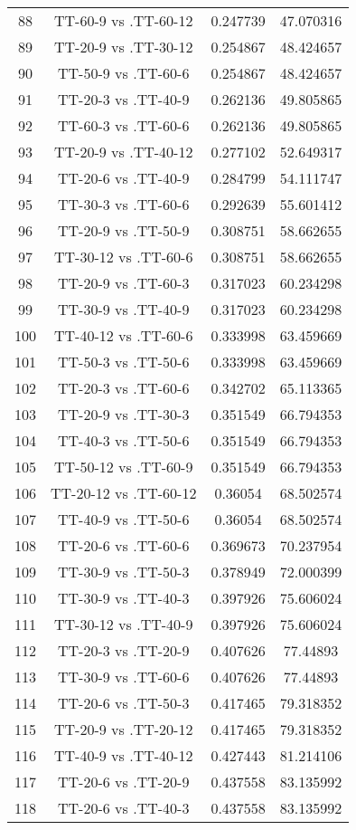 \documentclass[a4paper,10pt]{article}
\begin{document}
\begin{landscape}
\begin{table}[!htp]
\begin{tabular}{cccc}
88&TT-60-9 vs .TT-60-12&0.247739&47.070316\\
89&TT-20-9 vs .TT-30-12&0.254867&48.424657\\
90&TT-50-9 vs .TT-60-6&0.254867&48.424657\\
91&TT-20-3 vs .TT-40-9&0.262136&49.805865\\
92&TT-60-3 vs .TT-60-6&0.262136&49.805865\\
93&TT-20-9 vs .TT-40-12&0.277102&52.649317\\
94&TT-20-6 vs .TT-40-9&0.284799&54.111747\\
95&TT-30-3 vs .TT-60-6&0.292639&55.601412\\
96&TT-20-9 vs .TT-50-9&0.308751&58.662655\\
97&TT-30-12 vs .TT-60-6&0.308751&58.662655\\
98&TT-20-9 vs .TT-60-3&0.317023&60.234298\\
99&TT-30-9 vs .TT-40-9&0.317023&60.234298\\
100&TT-40-12 vs .TT-60-6&0.333998&63.459669\\
101&TT-50-3 vs .TT-50-6&0.333998&63.459669\\
102&TT-20-3 vs .TT-60-6&0.342702&65.113365\\
103&TT-20-9 vs .TT-30-3&0.351549&66.794353\\
104&TT-40-3 vs .TT-50-6&0.351549&66.794353\\
105&TT-50-12 vs .TT-60-9&0.351549&66.794353\\
106&TT-20-12 vs .TT-60-12&0.36054&68.502574\\
107&TT-40-9 vs .TT-50-6&0.36054&68.502574\\
108&TT-20-6 vs .TT-60-6&0.369673&70.237954\\
109&TT-30-9 vs .TT-50-3&0.378949&72.000399\\
110&TT-30-9 vs .TT-40-3&0.397926&75.606024\\
111&TT-30-12 vs .TT-40-9&0.397926&75.606024\\
112&TT-20-3 vs .TT-20-9&0.407626&77.44893\\
113&TT-30-9 vs .TT-60-6&0.407626&77.44893\\
114&TT-20-6 vs .TT-50-3&0.417465&79.318352\\
115&TT-20-9 vs .TT-20-12&0.417465&79.318352\\
116&TT-40-9 vs .TT-40-12&0.427443&81.214106\\
117&TT-20-6 vs .TT-20-9&0.437558&83.135992\\
118&TT-20-6 vs .TT-40-3&0.437558&83.135992\\

\end{tabular}
\end{table}
\end{landscape}
\end{document}
